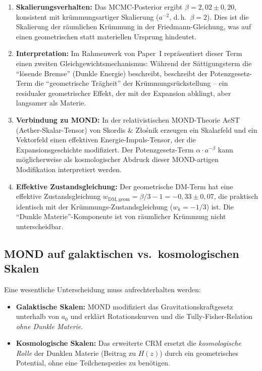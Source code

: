\documentclass[aps,prd,twocolumn,superscriptaddress,nofootinbib]{revtex4-2}
\begin{document}
\begin{enumerate}
\item \textbf{Skalierungsverhalten:} Das MCMC-Posterior ergibt $\beta = 2{,}02 \pm 0{,}20$, konsistent mit kr\"ummungsartiger Skalierung ($a^{-2}$, d.\,h.\ $\beta = 2$). Dies ist die Skalierung der r\"aumlichen Kr\"ummung in der Friedmann-Gleichung, was auf einen geometrischen statt materiellen Ursprung hindeutet.

\item \textbf{Interpretation:} Im Rahmenwerk von Paper~I repr\"asentiert dieser Term einen zweiten Gleichgewichtsmechanismus: W\"ahrend der S\"attigungsterm die "`l\"osende Bremse"' (Dunkle Energie) beschreibt, beschreibt der Potenzgesetz-Term die "`geometrische Tr\"agheit"' der Kr\"ummungsr\"uckstellung -- ein residualer geometrischer Effekt, der mit der Expansion abklingt, aber langsamer als Materie.

\item \textbf{Verbindung zu MOND:} In der relativistischen MOND-Theorie AeST (Aether-Skalar-Tensor) von Skordis \& Z{\l}o\'snik \cite{Skordis2021} erzeugen ein Skalarfeld und ein Vektorfeld einen effektiven Energie-Impuls-Tensor, der die Expansionsgeschichte modifiziert. Der Potenzgesetz-Term $\alpha \cdot a^{-\beta}$ kann m\"oglicherweise als kosmologischer Abdruck dieser MOND-artigen Modifikation interpretiert werden.

\item \textbf{Effektive Zustandsgleichung:} Der geometrische DM-Term hat eine effektive Zustandsgleichung $w_{\mathrm{DM,geom}} = \beta/3 - 1 = -0{,}33 \pm 0{,}07$, die praktisch identisch mit der Kr\"ummungs-Zustandsgleichung ($w_k = -1/3$) ist. Die "`Dunkle Materie"'-Komponente ist von r\"aumlicher Kr\"ummung nicht unterscheidbar.
\end{enumerate}

\subsection{MOND auf galaktischen vs.\ kosmologischen Skalen}

Eine wesentliche Unterscheidung muss aufrechterhalten werden:
\begin{itemize}
\item \textbf{Galaktische Skalen:} MOND modifiziert das Gravitationskraftgesetz unterhalb von $a_0$ und erkl\"art Rotationskurven und die Tully-Fisher-Relation \textit{ohne Dunkle Materie}.
\item \textbf{Kosmologische Skalen:} Das erweiterte CRM ersetzt die \textit{kosmologische Rolle} der Dunklen Materie (Beitrag zu $H(z)$) durch ein geometrisches Potential, ohne eine Teilchenspezies zu ben\"otigen.
\end{itemize}
\end{document}
